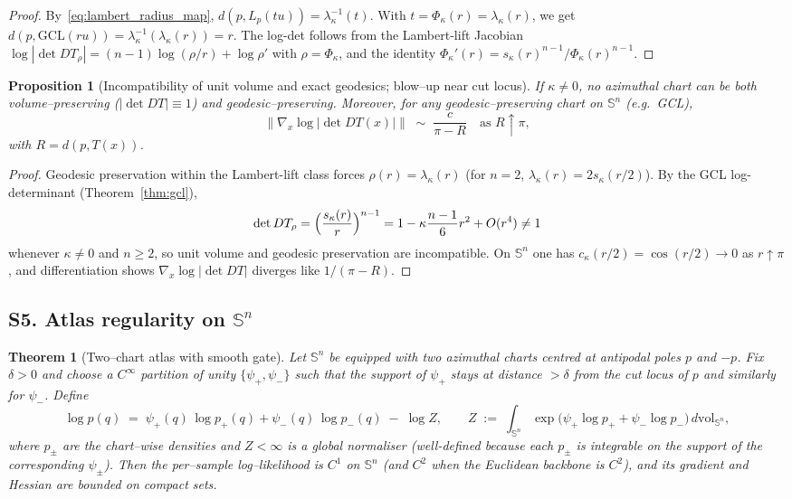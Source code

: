 \documentclass{article}
\newtheorem{theorem}{Theorem}
\newtheorem{proposition}{Proposition}
\theoremstyle{definition}
\theoremstyle{remark}
\newcommand{\SSS}{\mathbb{S}}
\begin{document}
\begin{proof}
By~\eqref{eq:lambert_radius_map}, $d(p,L_p(tu))=\lambda_\kappa^{-1}(t)$.
With $t=\Phi_\kappa(r)=\lambda_\kappa(r)$, we get
$d(p,\mathrm{GCL}(ru))=\lambda_\kappa^{-1}(\lambda_\kappa(r))=r$.
The log-det follows from the Lambert-lift Jacobian
$\log|\det DT_\rho|=(n-1)\log(\rho/r)+\log\rho'$ with $\rho=\Phi_\kappa$,
and the identity $\Phi_\kappa'(r)=s_\kappa(r)^{n-1}/\Phi_\kappa(r)^{n-1}$.
\end{proof}

\begin{proposition}[Incompatibility of unit volume and exact geodesics; blow--up near cut locus]\label{prop:gcl-blowup}
If $\kappa\neq0$, no azimuthal chart can be both volume--preserving ($|\det DT|\equiv1$) and
geodesic--preserving. Moreover, for any geodesic--preserving chart on $\SSS^n$ (e.g.\ GCL),
\[
\|\nabla_x\log|\det DT(x)|\|
\;\sim\;\frac{c}{\pi-R}
\quad\text{as }R\uparrow\pi,
\]
with $R=d(p,T(x))$.
\end{proposition}

\begin{proof}
Geodesic preservation within the Lambert-lift class forces $\rho(r)=\lambda_\kappa(r)$
(for $n=2$, $\lambda_\kappa(r)=2s_\kappa(r/2)$). By the GCL log-determinant
(Theorem~\ref{thm:gcl}),
\[
\det DT_\rho
=\Bigl(\frac{s_\kappa(r)}{r}\Bigr)^{n-1}
=1-\kappa\frac{n-1}{6}r^2+O(r^4)\neq1
\]
whenever $\kappa\neq0$ and $n\ge2$, so unit volume and geodesic preservation are incompatible.
On $\SSS^n$ one has $c_\kappa(r/2)=\cos(r/2)\to0$ as $r\uparrow\pi$, and differentiation shows
$\nabla_x\log|\det DT|$ diverges like $1/(\pi-R)$.
\end{proof}

\subsection*{S5. Atlas regularity on $\SSS^n$}

\begin{theorem}[Two--chart atlas with smooth gate]
Let $\SSS^n$ be equipped with two azimuthal charts centred at antipodal poles $p$ and $-p$. Fix
$\delta>0$ and choose a $C^\infty$ partition of unity $\{\psi_+,\psi_-\}$ such that the support of
$\psi_+$ stays at distance $>\delta$ from the cut locus of $p$ and similarly for $\psi_-$. Define
\[
\log p(q) \;=\; \psi_+(q)\,\log p_+(q) + \psi_-(q)\,\log p_-(q) \;-\; \log Z,
\qquad
Z \;:=\; \int_{\SSS^n} \exp\!\bigl(\psi_+\log p_+ + \psi_-\log p_-\bigr)\,d\mathrm{vol}_{\SSS^n},
\]
where $p_\pm$ are the chart--wise densities and $Z<\infty$ is a global
normaliser (well-defined because each $p_\pm$ is integrable on the support of
the corresponding $\psi_\pm$). Then the per--sample log--likelihood is $C^1$ on
$\SSS^n$ (and $C^2$ when the Euclidean backbone is $C^2$), and its gradient and Hessian are
bounded on compact sets.
\end{theorem}
\end{document}
